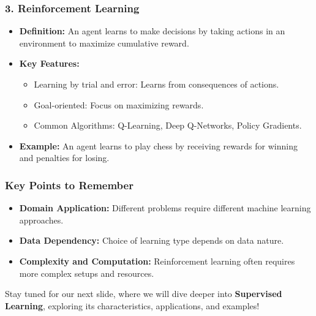 \documentclass{beamer}
\begin{document}
\begin{frame}[fragile]
    \frametitle{3. Reinforcement Learning}
    \begin{itemize}
        \item \textbf{Definition:} An agent learns to make decisions by taking actions in an environment to maximize cumulative reward.
        \item \textbf{Key Features:}
            \begin{itemize}
                \item Learning by trial and error: Learns from consequences of actions.
                \item Goal-oriented: Focus on maximizing rewards.
                \item Common Algorithms: Q-Learning, Deep Q-Networks, Policy Gradients.
            \end{itemize}
        \item \textbf{Example:} An agent learns to play chess by receiving rewards for winning and penalties for losing.
    \end{itemize}
\end{frame}

\begin{frame}[fragile]
    \frametitle{Key Points to Remember}
    \begin{itemize}
        \item \textbf{Domain Application:} Different problems require different machine learning approaches.
        \item \textbf{Data Dependency:} Choice of learning type depends on data nature.
        \item \textbf{Complexity and Computation:} Reinforcement learning often requires more complex setups and resources.
    \end{itemize}
    Stay tuned for our next slide, where we will dive deeper into \textbf{Supervised Learning}, exploring its characteristics, applications, and examples!
\end{frame}
\end{document}
